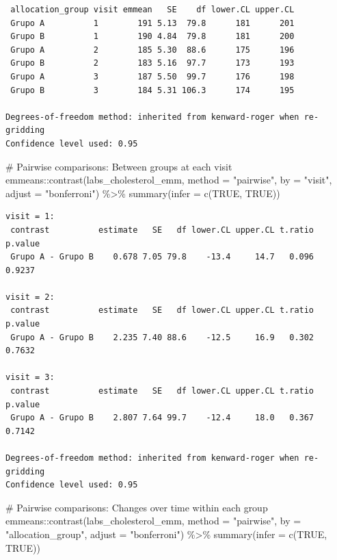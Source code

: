 \documentclass[
  letterpaper,
  DIV=11,
  numbers=noendperiod]{scrartcl}
\newenvironment{Shaded}{\begin{snugshade}}{\end{snugshade}}
\newcommand{\AttributeTok}[1]{\textcolor[rgb]{0.40,0.45,0.13}{#1}}
\newcommand{\CommentTok}[1]{\textcolor[rgb]{0.37,0.37,0.37}{#1}}
\newcommand{\ConstantTok}[1]{\textcolor[rgb]{0.56,0.35,0.01}{#1}}
\newcommand{\FunctionTok}[1]{\textcolor[rgb]{0.28,0.35,0.67}{#1}}
\newcommand{\NormalTok}[1]{\textcolor[rgb]{0.00,0.23,0.31}{#1}}
\newcommand{\SpecialCharTok}[1]{\textcolor[rgb]{0.37,0.37,0.37}{#1}}
\newcommand{\StringTok}[1]{\textcolor[rgb]{0.13,0.47,0.30}{#1}}
\begin{document}
\begin{verbatim}
 allocation_group visit emmean   SE    df lower.CL upper.CL
 Grupo A          1        191 5.13  79.8      181      201
 Grupo B          1        190 4.84  79.8      181      200
 Grupo A          2        185 5.30  88.6      175      196
 Grupo B          2        183 5.16  97.7      173      193
 Grupo A          3        187 5.50  99.7      176      198
 Grupo B          3        184 5.31 106.3      174      195

Degrees-of-freedom method: inherited from kenward-roger when re-gridding 
Confidence level used: 0.95 
\end{verbatim}

\begin{Shaded}
\begin{Highlighting}[]
\CommentTok{\# Pairwise comparisons: Between groups at each visit}
\NormalTok{emmeans}\SpecialCharTok{::}\FunctionTok{contrast}\NormalTok{(labs\_cholesterol\_emm, }\AttributeTok{method =} \StringTok{"pairwise"}\NormalTok{, }\AttributeTok{by =} \StringTok{"visit"}\NormalTok{, }\AttributeTok{adjust =} \StringTok{"bonferroni"}\NormalTok{) }\SpecialCharTok{\%\textgreater{}\%} \FunctionTok{summary}\NormalTok{(}\AttributeTok{infer =} \FunctionTok{c}\NormalTok{(}\ConstantTok{TRUE}\NormalTok{, }\ConstantTok{TRUE}\NormalTok{))}
\end{Highlighting}
\end{Shaded}

\begin{verbatim}
visit = 1:
 contrast          estimate   SE   df lower.CL upper.CL t.ratio p.value
 Grupo A - Grupo B    0.678 7.05 79.8    -13.4     14.7   0.096  0.9237

visit = 2:
 contrast          estimate   SE   df lower.CL upper.CL t.ratio p.value
 Grupo A - Grupo B    2.235 7.40 88.6    -12.5     16.9   0.302  0.7632

visit = 3:
 contrast          estimate   SE   df lower.CL upper.CL t.ratio p.value
 Grupo A - Grupo B    2.807 7.64 99.7    -12.4     18.0   0.367  0.7142

Degrees-of-freedom method: inherited from kenward-roger when re-gridding 
Confidence level used: 0.95 
\end{verbatim}

\begin{Shaded}
\begin{Highlighting}[]
\CommentTok{\# Pairwise comparisons: Changes over time within each group}
\NormalTok{emmeans}\SpecialCharTok{::}\FunctionTok{contrast}\NormalTok{(labs\_cholesterol\_emm, }\AttributeTok{method =} \StringTok{"pairwise"}\NormalTok{, }\AttributeTok{by =} \StringTok{"allocation\_group"}\NormalTok{, }\AttributeTok{adjust =} \StringTok{"bonferroni"}\NormalTok{) }\SpecialCharTok{\%\textgreater{}\%} \FunctionTok{summary}\NormalTok{(}\AttributeTok{infer =} \FunctionTok{c}\NormalTok{(}\ConstantTok{TRUE}\NormalTok{, }\ConstantTok{TRUE}\NormalTok{))}
\end{Highlighting}
\end{Shaded}
\end{document}
